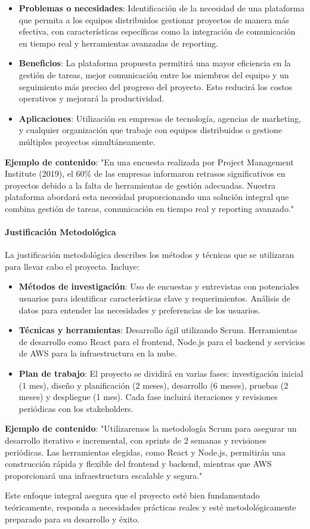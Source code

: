 \begin{itemize}
    \item \textbf{Problemas o necesidades}: Identificación de la necesidad de una plataforma que permita a los equipos distribuidos gestionar proyectos de manera más efectiva, con características específicas como la integración de comunicación en tiempo real y herramientas avanzadas de reporting.
    \item \textbf{Beneficios}: La plataforma propuesta permitirá una mayor eficiencia en la gestión de tareas, mejor comunicación entre los miembros del equipo y un seguimiento más preciso del progreso del proyecto. Esto reducirá los costos operativos y mejorará la productividad.
    \item \textbf{Aplicaciones}: Utilización en empresas de tecnología, agencias de marketing, y cualquier organización que trabaje con equipos distribuidos o gestione múltiples proyectos simultáneamente.
\end{itemize}
\textbf{Ejemplo de contenido}: "En una encuesta realizada por Project Management Institute (2019), el 60\% de las empresas informaron retrasos significativos en proyectos debido a la falta de herramientas de gestión adecuadas. Nuestra plataforma abordará esta necesidad proporcionando una solución integral que combina gestión de tareas, comunicación en tiempo real y reporting avanzado."

\paragraph{Justificación Metodológica}
La justificación metodológica describes los métodos y técnicas que se utilizaran para llevar cabo el proyecto. Incluye: 

\begin{itemize}
    \item \textbf{Métodos de investigación}: Uso de encuestas y entrevistas con potenciales usuarios para identificar características clave y requerimientos. Análisis de datos para entender las necesidades y preferencias de los usuarios.
    \item \textbf{Técnicas y herramientas}: Desarrollo ágil utilizando Scrum. Herramientas de desarrollo como React para el frontend, Node.js para el backend y servicios de AWS para la infraestructura en la nube.
    \item \textbf{Plan de trabajo}: El proyecto se dividirá en varias fases: investigación inicial (1 mes), diseño y planificación (2 meses), desarrollo (6 meses), pruebas (2 meses) y despliegue (1 mes). Cada fase incluirá iteraciones y revisiones periódicas con los stakeholders.
\end{itemize}
\textbf{Ejemplo de contenido}: "Utilizaremos la metodología Scrum para asegurar un desarrollo iterativo e incremental, con sprints de 2 semanas y revisiones periódicas. Las herramientas elegidas, como React y Node.js, permitirán una construcción rápida y flexible del frontend y backend, mientras que AWS proporcionará una infraestructura escalable y segura."

Este enfoque integral asegura que el proyecto esté bien fundamentado teóricamente, responda a necesidades prácticas reales y esté metodológicamente preparado para su desarrollo y éxito.

 
